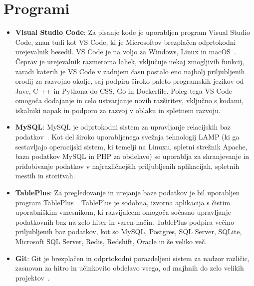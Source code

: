 \documentclass[a4paper, 12pt]{book}
\begin{document}
\section{Programi}
 \begin{itemize}
  \item \textbf{Visual Studio Code}: Za pisanje kode je uporabljen program Visual Studio Code, znan tudi kot VS Code, ki je Microsoftov brezplačen odprtokodni urejevalnik besedil. VS Code je na voljo za Windows, Linux in macOS~\cite{VSC}. Čeprav je urejevalnik razmeroma lahek, vključuje nekaj zmogljivih funkcij, zaradi katerih je VS Code v zadnjem času postalo eno najbolj priljubljenih orodij za razvojno okolje, saj podpira široko paleto programskih jezikov od Jave, C ++ in Pythona do CSS, Go in Dockerfile. Poleg tega VS Code omogoča dodajanje in celo ustvarjanje novih razširitev, vključno s kodami, iskalniki napak in podporo za razvoj v oblaku in spletnem razvoju.

 \item \textbf{MySQL}: MySQL je odprtokodni sistem za upravljanje relacijskih baz podatkov~\cite{MySQL}. Kot del široko uporabljenega svežnja tehnologij LAMP (ki ga sestavljajo operacijski sistem, ki temelji na Linuxu, spletni strežnik Apache, baza podatkov MySQL in PHP za obdelavo) se uporablja za shranjevanje in pridobivanje podatkov v najrazličnejših priljubljenih aplikacijah, spletnih mestih in storitvah.

\item \textbf{TablePlus}: Za pregledovanje in urejanje baze podatkov je bil uporabljen program TablePlus~\cite{TablePlus}. TablePlus je sodobna, izvorna aplikacija s čistim uporabniškim vmesnikom, ki razvijalcem omogoča sočasno upravljanje podatkovnih baz na zelo hiter in varen način. TablePlus podpira večino priljubljenih baz podatkov, kot so MySQL, Postgres, SQL Server, SQLite, Microsoft SQL Server, Redis, Redshift, Oracle in še veliko več.

\item \textbf{Git}: Git je brezplačen in odprtokodni porazdeljeni sistem za nadzor različic, zasnovan za hitro in učinkovito obdelavo vsega, od majhnih do zelo velikih projektov~\cite{Git}.
\end{itemize}
\end{document}
